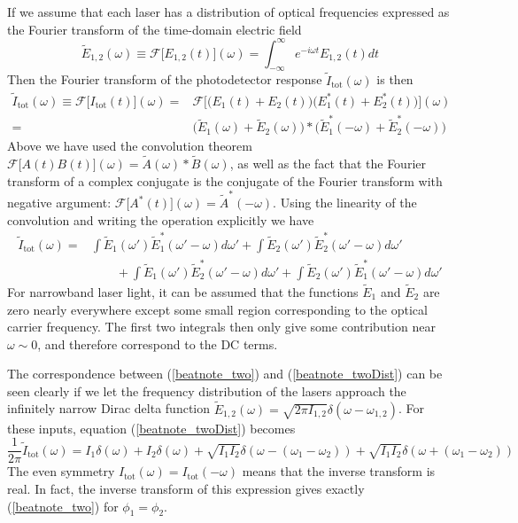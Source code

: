 If we assume that each laser has a distribution of optical frequencies expressed as the Fourier transform of the time-domain electric field
\begin{equation}
	\tilde{E}_{1,2}(\omega) \equiv \mathcal{F}\Big[E_{1,2}(t)\Big](\omega) = \int_{-\infty}^{\infty} e^{-i\omega t} E_{1,2}(t) dt
\end{equation}
Then the Fourier transform of the photodetector response $\tilde{I}_\mathrm{tot}(\omega)$ is then
\begin{align*}
	\tilde{I}_\mathrm{tot}(\omega) \equiv \mathcal{F}\Big[I_\mathrm{tot}(t)\Big](\omega)
	=& \mathcal{F}\Bigg[\Big(E_1(t) + E_2(t)\Big)\Big(E_1^*(t) + E_2^*(t)\Big)\Bigg](\omega) \nonumber \\
	=& \Big(\tilde{E}_1(\omega) + \tilde{E}_2(\omega)\Big) * \Big(\tilde{E}_1^*(-\omega) + \tilde{E}_2^*(-\omega)\Big)
\end{align*}
Above we have used the convolution theorem $\mathcal{F}\Big[A(t) B(t)\Big](\omega) = \tilde{A}(\omega) * \tilde{B}(\omega)$, as well as the fact that the Fourier transform of a complex conjugate is the conjugate of the Fourier transform with negative argument: $\mathcal{F}\Big[A^*(t)\Big](\omega) = \tilde{A}^*(-\omega)$. Using the linearity of the convolution and writing the operation explicitly we have
\begin{align} \label{beatnote_twoDist}
	\tilde{I}_\mathrm{tot}(\omega) =& \int \tilde{E}_1(\omega') \tilde{E}^*_1(\omega'-\omega) d\omega' + \int \tilde{E}_2(\omega') \tilde{E}^*_2(\omega'-\omega) d\omega' \nonumber \\
	& \qquad+ \int \tilde{E}_1(\omega') \tilde{E}^*_2(\omega'-\omega) d\omega' + \int \tilde{E}_2(\omega') \tilde{E}^*_1(\omega'-\omega) d\omega'%
\end{align}
For narrowband laser light, it can be assumed that the functions $\tilde{E}_1$ and $\tilde{E}_2$ are zero nearly everywhere except some small region corresponding to the optical carrier frequency. The first two integrals then only give some contribution near $\omega \sim 0$, and therefore correspond to the DC terms.

The correspondence between (\ref{beatnote_two}) and (\ref{beatnote_twoDist}) can be seen clearly if we let the frequency distribution of the lasers approach the infinitely narrow Dirac delta function $\tilde{E}_{1,2}(\omega) = \sqrt{2\pi I_{1,2}}\delta (\omega - \omega_{1,2})$. For these inputs, equation (\ref{beatnote_twoDist}) becomes
\begin{equation}
	\frac{1}{2\pi}\tilde{I}_\mathrm{tot}(\omega) = I_1 \delta(\omega) + I_2 \delta(\omega) + \sqrt{I_1 I_2} \delta(\omega - (\omega_1 - \omega_2)) + \sqrt{I_1 I_2} \delta(\omega + (\omega_1 - \omega_2))
\end{equation}
The even symmetry $I_\mathrm{tot}(\omega) = I_\mathrm{tot}(-\omega)$ means that the inverse transform is real. In fact, the inverse transform of this expression gives exactly (\ref{beatnote_two}) for $\phi_1=\phi_2$.

